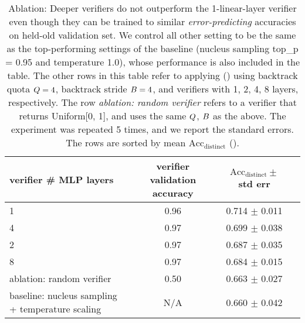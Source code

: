 \begin{table*}[t]
\begin{center}
\begin{small}
\begin{tabular}{ lccc }
\toprule
\textbf{verifier \# MLP layers} & \textbf{verifier validation accuracy} & \textbf{$\text{Acc}_\text{distinct} \pm$ std err} \\
\hline
1 & 0.96 & 0.714 $\pm$ 0.011 \\
\hline
4 & 0.97 & 0.699 $\pm$ 0.038 \\
\hline
2 & 0.97 & 0.687 $\pm$ 0.035 \\
\hline
8 & 0.97 & 0.684 $\pm$ 0.015 \\
\hline
ablation: random verifier &  0.50 & 0.663 $\pm$ 0.027 \\
\hline
baseline: nucleus sampling + temperature scaling & N/A & 0.660 $\pm$ 0.042 \\
\bottomrule
\end{tabular}
\end{small}
\end{center}
\caption{
Ablation: 
Deeper verifiers do not outperform the 1-linear-layer verifier
even though they can be trained to similar \emph{error-predicting} accuracies on held-old validation set.
We control all other setting to be the same as the top-performing settings of the baseline
(nucleus sampling top\_p = 0.95 \citep{holtzman2020the} and temperature 1.0),
whose performance is also included in the table.
The other rows in this table
refer to applying \algoName () 
using backtrack quota $Q = 4$,
backtrack stride $B = 4$,
and verifiers with 1, 2, 4, 8 layers, respectively.
The row \emph{ablation: random verifier} refers to 
a verifier that returns Uniform[0, 1], and uses the same $Q$, $B$ as the above.
The experiment was repeated 5 times,
and we report the standard errors.
The rows are sorted by mean $\text{Acc}_\text{distinct}$ ().
}
\label{table:verifier_more_mlp_layers}
\end{table*}



